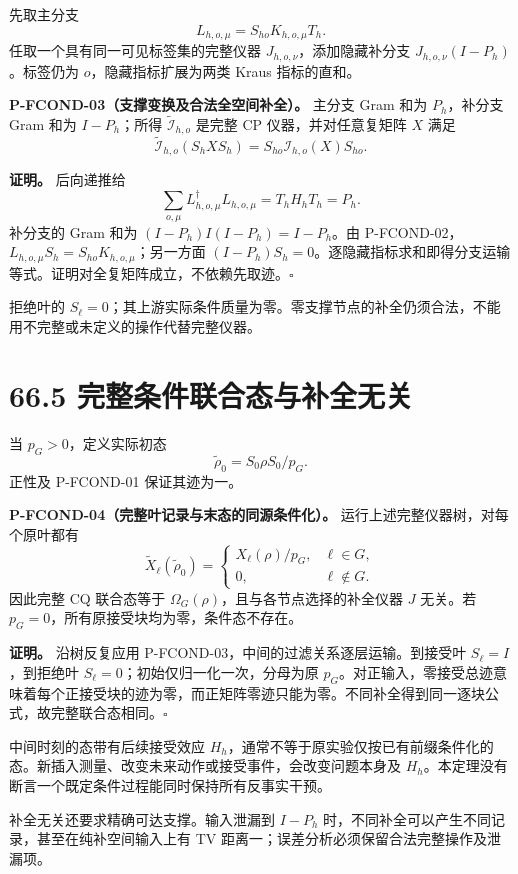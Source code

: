 \documentclass[
  11pt,
  oneside]{book}
\begin{document}
先取主分支 \[
L_{h,o,\mu}=S_{ho}K_{h,o,\mu}T_h.
\] 任取一个具有同一可见标签集的完整仪器 \(J_{h,o,\nu}\)，添加隐藏补分支
\(J_{h,o,\nu}(I-P_h)\)。标签仍为 \(o\)，隐藏指标扩展为两类 Kraus
指标的直和。

\protect\hypertarget{p-fcond-03}{}{}
\textbf{P-FCOND-03（支撑变换及合法全空间补全）。} 主分支 Gram 和为
\(P_h\)，补分支 Gram 和为 \(I-P_h\)；所得
\(\widetilde{\mathcal I}_{h,o}\) 是完整 CP 仪器，并对任意复矩阵 \(X\)
满足 \[
\widetilde{\mathcal I}_{h,o}(S_hXS_h)
=S_{ho}\mathcal I_{h,o}(X)S_{ho}.
\]

\textbf{证明。} 后向递推给 \[
\sum_{o,\mu}L_{h,o,\mu}^{\dagger}L_{h,o,\mu}
=T_hH_hT_h=P_h.
\] 补分支的 Gram 和为 \((I-P_h)I(I-P_h)=I-P_h\)。由
P-FCOND-02，\(L_{h,o,\mu}S_h=S_{ho}K_{h,o,\mu}\)；另一方面
\((I-P_h)S_h=0\)。逐隐藏指标求和即得分支运输等式。证明对全复矩阵成立，不依赖先取迹。\(\square\)

拒绝叶的
\(S_\ell=0\)；其上游实际条件质量为零。零支撑节点的补全仍须合法，不能用不完整或未定义的操作代替完整仪器。

\section{66.5 完整条件联合态与补全无关}

当 \(p_G>0\)，定义实际初态 \[
\widetilde\rho_0=S_0\rho S_0/p_G.
\] 正性及 P-FCOND-01 保证其迹为一。

\protect\hypertarget{p-fcond-04}{}{}
\textbf{P-FCOND-04（完整叶记录与末态的同源条件化）。}
运行上述完整仪器树，对每个原叶都有 \[
\widetilde X_\ell(\widetilde\rho_0)=
\begin{cases}X_\ell(\rho)/p_G,&\ell\in G,\\0,&\ell\notin G.\end{cases}
\] 因此完整 CQ 联合态等于 \(\Omega_G(\rho)\)，且与各节点选择的补全仪器
\(J\) 无关。若 \(p_G=0\)，所有原接受块均为零，条件态不存在。

\textbf{证明。} 沿树反复应用
P-FCOND-03，中间的过滤关系逐层运输。到接受叶 \(S_\ell=I\)，到拒绝叶
\(S_\ell=0\)；初始仅归一化一次，分母为原
\(p_G\)。对正输入，零接受总迹意味着每个正接受块的迹为零，而正矩阵零迹只能为零。不同补全得到同一逐块公式，故完整联合态相同。\(\square\)

中间时刻的态带有后续接受效应
\(H_h\)，通常不等于原实验仅按已有前缀条件化的态。新插入测量、改变未来动作或接受事件，会改变问题本身及
\(H_h\)。本定理没有断言一个既定条件过程能同时保持所有反事实干预。

补全无关还要求精确可达支撑。输入泄漏到 \(I-P_h\)
时，不同补全可以产生不同记录，甚至在纯补空间输入上有 TV
距离一；误差分析必须保留合法完整操作及泄漏项。
\end{document}
